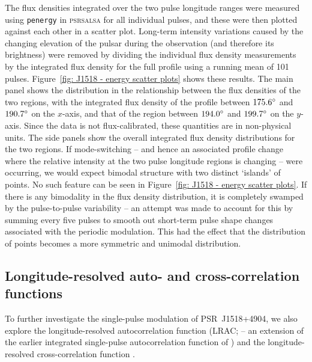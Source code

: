 The flux densities integrated over the two pulse longitude ranges were measured using \texttt{penergy} in \textsc{psrsalsa} for all individual pulses, and these were then plotted against each other in a scatter plot. Long-term intensity variations caused by the changing elevation of the pulsar during the observation (and therefore its brightness) were removed by dividing the individual flux density measurements by the integrated flux density for the full profile using a running mean of 101 pulses. Figure~\ref{fig: J1518 - energy scatter plots} shows these results. The main panel shows the distribution in the relationship between the flux densities of the two regions, with the integrated flux density of the profile between $175.6^\circ$ and $190.7^\circ$ on the $x$-axis, and that of the region between $194.0^\circ$ and $199.7^\circ$ on the $y$-axis. Since the data is not flux-calibrated, these quantities are in non-physical units. The side panels show the overall integrated flux density distributions for the two regions. If mode-switching -- and hence an associated profile change where the relative intensity at the two pulse longitude regions is changing -- were occurring, we would expect bimodal structure with two distinct `islands' of points. No such feature can be seen in Figure~\ref{fig: J1518 - energy scatter plots}. If there is any bimodality in the flux density distribution, it is completely swamped by the pulse-to-pulse variability -- an attempt was made to account for this by summing every five pulses to smooth out short-term pulse shape changes associated with the periodic modulation. This had the effect that the distribution of points becomes a more symmetric and unimodal distribution. 















\subsection{Longitude-resolved auto- and cross-correlation functions}
\label{sec: J1518 - analysis - correlation} 

To further investigate the single-pulse modulation of PSR~J1518+4904, we also explore the longitude-resolved autocorrelation function (LRAC; \citealt{ESxx2003} -- an extension of the earlier integrated single-pulse autocorrelation function of \citealt{JAPx2001}) and the longitude-resolved cross-correlation function \citep[LRCC;][]{Pxxx1986}.


